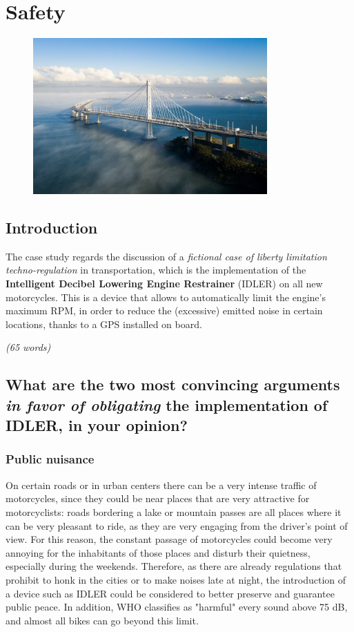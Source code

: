 \chapter{Safety}
\begin{figure}[h]
\centering
\includegraphics[width=0.8\textwidth]{Capitoli_Report/4.1_Safety.png}
\caption{\cite{picsafety}}
\label{fig:safety}
\end{figure}
\newpage
\section{Introduction}
The case study regards the discussion of a \textit{fictional case of liberty limitation techno-regulation} in transportation, which is the implementation of the \textbf{Intelligent Decibel Lowering Engine Restrainer} (IDLER) on all new motorcycles. This is a device that allows to automatically limit the engine's maximum RPM, in order to reduce the (excessive) emitted noise in certain locations, thanks to a GPS installed on board.

\emph{(65 words)}

\section{What are the two most convincing arguments \textit{in favor of obligating} the implementation of IDLER, in your opinion?}
\subsection{Public nuisance}
On certain roads or in urban centers there can be a very intense traffic of motorcycles, since they could be near places that are very attractive for motorcyclists: roads bordering a lake or mountain passes are all places where it can be very pleasant to ride, as they are very engaging from the driver's point of view. For this reason, the constant passage of motorcycles could become very annoying for the inhabitants of those places and disturb their quietness, especially during the weekends. Therefore, as there are already regulations that prohibit to honk in the cities or to make noises late at night, the introduction of a device such as IDLER could be considered to better preserve and guarantee public peace. In addition, WHO classifies as "harmful" every sound above 75 dB, and almost all bikes can go beyond this limit.

